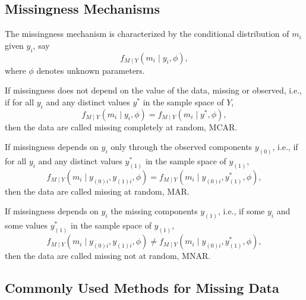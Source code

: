 \subsection{Missingness Mechanisms}

The missingness mechanism is characterized by the conditional distribution of $m_{i}$ given $y_{i}$, say
\begin{equation}
	f_{M\mid Y}\left(m_{i}\mid y_{i},\phi\right),
\end{equation}
where $\phi$ denotes unknown parameters.

\begin{definition}
	If missingness does not depend on the value of the data, missing or observed, i.e., if for all $y_{i}$ and any distinct values $y^{*}$ in the sample space of $Y$,
	\begin{equation}
		f_{M\mid Y}\left(m_{i} \mid y_{i},\phi\right)=f_{M\mid Y}\left(m_{i} \mid y^{*},\phi\right),
	\end{equation}
	then the data are called missing completely at random, MCAR.
\end{definition}

\begin{definition}
	If missingness depends on $y_{i}$ only through the observed components $y_{(0)}$, i.e., if for all $y_{i}$ and any distinct values $y_{(1)}^{*}$ in the sample space of $y_{(1)}$,
	\begin{equation}
		f_{M \mid Y}\left(m_{i}\mid y_{(0)i},y_{(1)i},\phi\right)=f_{M\mid Y}\left(m_{i}\mid y_{(0)i},y_{(1)}^{*},\phi\right),
	\end{equation}
	then the data are called missing at random, MAR.
\end{definition}

\begin{definition}
	If missingness depends on $y_{i}$ the missing components $y_{(1)}$, i.e., if some $y_{i}$ and some values $y_{(1)}^{*}$ in the sample space of $y_{(1)}$,
	\begin{equation}
		f_{M \mid Y}\left(m_{i}\mid y_{(0)i},y_{(1)i},\phi\right)\neq f_{M\mid Y}\left(m_{i}\mid y_{(0)i},y_{(1)}^{*},\phi\right),
	\end{equation}
	then the data are called missing not at random, MNAR.
\end{definition}

\subsection{Commonly Used Methods for Missing Data}

